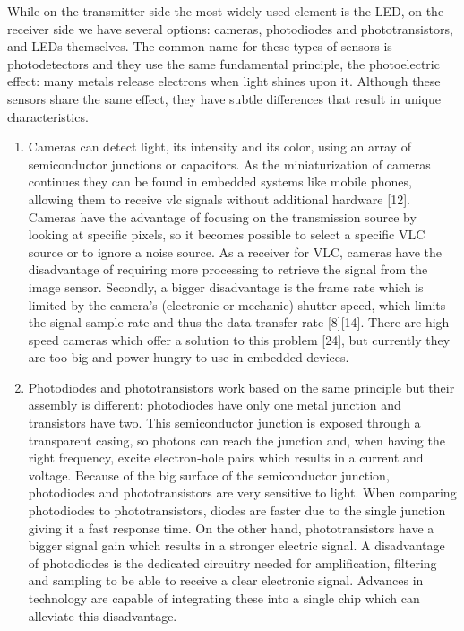 While on the transmitter side the most widely used element is the LED, on the
receiver side we have several options: cameras, photodiodes and phototransistors,
and LEDs themselves. The common name for these types of sensors is
photodetectors and they use the same fundamental principle, the photoelectric
effect: many metals release electrons when light shines upon it. Although these
sensors share the same effect, they have subtle differences that result in unique
characteristics.

\begin{enumerate}

\item Cameras can detect light, its intensity and its color, using an array of semiconductor
junctions or capacitors. As the miniaturization of cameras continues
they can be found in embedded systems like mobile phones, allowing
them to receive vlc signals without additional hardware [12]. Cameras have
the advantage of focusing on the transmission source by looking at specific
pixels, so it becomes possible to select a specific VLC source or to ignore
a noise source. As a receiver for VLC, cameras have the disadvantage
of requiring more processing to retrieve the signal from the image sensor.
Secondly, a bigger disadvantage is the frame rate which is limited by the
camera’s (electronic or mechanic) shutter speed, which limits the signal
sample rate and thus the data transfer rate [8][14]. There are high speed
cameras which offer a solution to this problem [24], but currently they are
too big and power hungry to use in embedded devices.

\item Photodiodes and phototransistors work based on the same principle but
their assembly is different: photodiodes have only one metal junction and
transistors have two. This semiconductor junction is exposed through a
transparent casing, so photons can reach the junction and, when having
the right frequency, excite electron-hole pairs which results in a current and
voltage. Because of the big surface of the semiconductor junction, photodiodes
and phototransistors are very sensitive to light. When comparing
photodiodes to phototransistors, diodes are faster due to the single junction
giving it a fast response time. On the other hand, phototransistors have a
bigger signal gain which results in a stronger electric signal. A disadvantage
of photodiodes is the dedicated circuitry needed for amplification, filtering
and sampling to be able to receive a clear electronic signal. Advances in
technology are capable of integrating these into a single chip which can
alleviate this disadvantage.


\end{enumerate}
